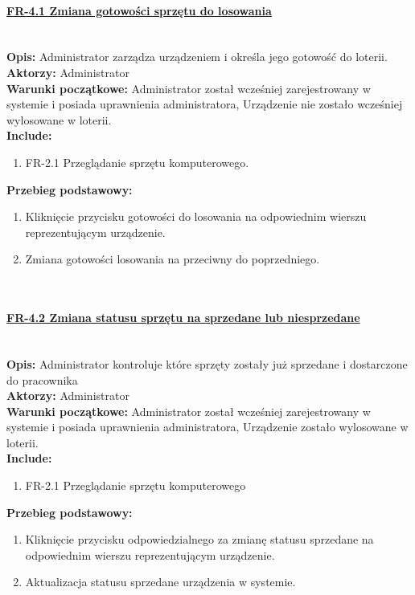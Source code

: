 \paragraph{\underline{FR-4.1 Zmiana gotowości sprzętu do losowania}}\mbox{}\\[1mm]
	\noindent\textbf{Opis:} Administrator zarządza urządzeniem i określa jego gotowość do loterii.\\
	\noindent\textbf{Aktorzy:} Administrator\\
	\textbf{Warunki początkowe:} Administrator został wcześniej zarejestrowany w systemie i posiada uprawnienia administratora, Urządzenie nie zostało wcześniej wylosowane w loterii.\\
	\textbf{Include:} 
	\begin{enumerate}[noparskip]
		\item FR-2.1 Przeglądanie sprzętu komputerowego.
	\end{enumerate}
    \textbf{Przebieg podstawowy:}
	\begin{enumerate}[noparskip]
		\item Kliknięcie przycisku gotowości do losowania na odpowiednim wierszu reprezentującym urządzenie.
		\item Zmiana gotowości losowania na przeciwny do poprzedniego.
  \end{enumerate} \mbox{}\\[-11mm]

\paragraph{\underline{FR-4.2 Zmiana statusu sprzętu na sprzedane lub niesprzedane}}\mbox{}\\[1mm]
	\noindent\textbf{Opis:} Administrator kontroluje które sprzęty zostały już sprzedane i dostarczone do pracownika\\
	\noindent\textbf{Aktorzy:} Administrator\\
	\textbf{Warunki początkowe:} Administrator został wcześniej zarejestrowany w systemie i posiada uprawnienia administratora, Urządzenie zostało wylosowane w loterii.\\
	\textbf{Include:} 
	\begin{enumerate}[noparskip]
		\item FR-2.1 Przeglądanie sprzętu komputerowego
	\end{enumerate}
  \textbf{Przebieg podstawowy:}
	\begin{enumerate}[noparskip]
		\item Kliknięcie przycisku odpowiedzialnego za zmianę statusu sprzedane na odpowiednim wierszu reprezentującym urządzenie.
		\item Aktualizacja statusu sprzedane urządzenia w systemie.
  \end{enumerate} \mbox{}\\[-11mm]

